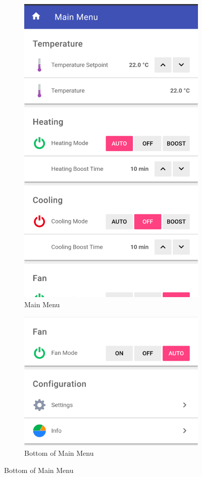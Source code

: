\begin{figure}
\begin{subfigure}{0.33\textwidth}
  \includegraphics[width=.75\linewidth]{img/ui-main-menu1.png}
  \caption{Main Menu}
  \label{fig:ui-main-menu1}
\end{subfigure}
\begin{subfigure}{0.33\textwidth}
  \centering
  \includegraphics[width=.75\linewidth]{img/ui-main-menu2.png}
  \caption{Bottom of Main Menu}
  \label{fig:ui-main-menu2}
\end{subfigure}%


\end{figure}

